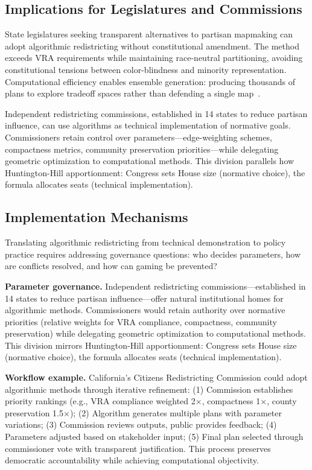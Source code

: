 \subsection{Implications for Legislatures and Commissions}

State legislatures seeking transparent alternatives to partisan mapmaking can adopt algorithmic redistricting without constitutional amendment. The method exceeds VRA requirements while maintaining race-neutral partitioning, avoiding constitutional tensions between color-blindness and minority representation. Computational efficiency enables ensemble generation: producing thousands of plans to explore tradeoff spaces rather than defending a single map~\cite{deluca2026recursive}.

Independent redistricting commissions, established in 14 states to reduce partisan influence, can use algorithms as technical implementation of normative goals. Commissioners retain control over parameters---edge-weighting schemes, compactness metrics, community preservation priorities---while delegating geometric optimization to computational methods. This division parallels how Huntington-Hill apportionment: Congress sets House size (normative choice), the formula allocates seats (technical implementation).

\subsection{Implementation Mechanisms}

Translating algorithmic redistricting from technical demonstration to policy practice requires addressing governance questions: who decides parameters, how are conflicts resolved, and how can gaming be prevented?

\textbf{Parameter governance.} Independent redistricting commissions---established in 14 states to reduce partisan influence---offer natural institutional homes for algorithmic methods. Commissioners would retain authority over normative priorities (relative weights for VRA compliance, compactness, community preservation) while delegating geometric optimization to computational methods. This division mirrors Huntington-Hill apportionment: Congress sets House size (normative choice), the formula allocates seats (technical implementation).

\textbf{Workflow example.} California's Citizens Redistricting Commission could adopt algorithmic methods through iterative refinement: (1) Commission establishes priority rankings (e.g., VRA compliance weighted 2×, compactness 1×, county preservation 1.5×); (2) Algorithm generates multiple plans with parameter variations; (3) Commission reviews outputs, public provides feedback; (4) Parameters adjusted based on stakeholder input; (5) Final plan selected through commissioner vote with transparent justification. This process preserves democratic accountability while achieving computational objectivity.


